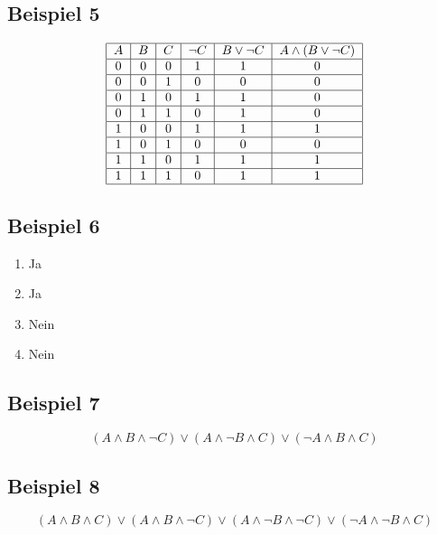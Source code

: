 \documentclass[12pt, a4paper, oneside]{article}
\begin{document}
\subsection{Beispiel 5}
\begin{equation}
  \begin{tabular}{| c | c | c | c | c | c |}
    \hline
    $A$ & $B$ & $C$ & $\lnot C$ & $B \lor \lnot C$ & $A \land (B \lor \lnot C)$ \\ \hline
    0 & 0 & 0 & 1 & 1 & 0 \\ \hline
    0 & 0 & 1 & 0 & 0 & 0 \\ \hline
    0 & 1 & 0 & 1 & 1 & 0 \\ \hline
    0 & 1 & 1 & 0 & 1 & 0 \\ \hline
    1 & 0 & 0 & 1 & 1 & 1 \\ \hline
    1 & 0 & 1 & 0 & 0 & 0 \\ \hline
    1 & 1 & 0 & 1 & 1 & 1 \\ \hline
    1 & 1 & 1 & 0 & 1 & 1 \\ \hline
  \end{tabular}
\end{equation}

\subsection{Beispiel 6}
\begin{enumerate}
  \item Ja
  \item Ja
  \item Nein
  \item Nein
\end{enumerate}

\subsection{Beispiel 7}
\begin{equation}
  (A \land B \land \lnot C) \lor (A \land \lnot B \land C) \lor (\lnot A \land B \land C)
\end{equation}

\subsection{Beispiel 8}
\begin{equation}
  (A \land B \land C) \lor (A \land B \land \lnot C) \lor (A \land \lnot B \land \lnot C) \lor (\lnot A \land \lnot B \land C)
\end{equation}
\end{document}
